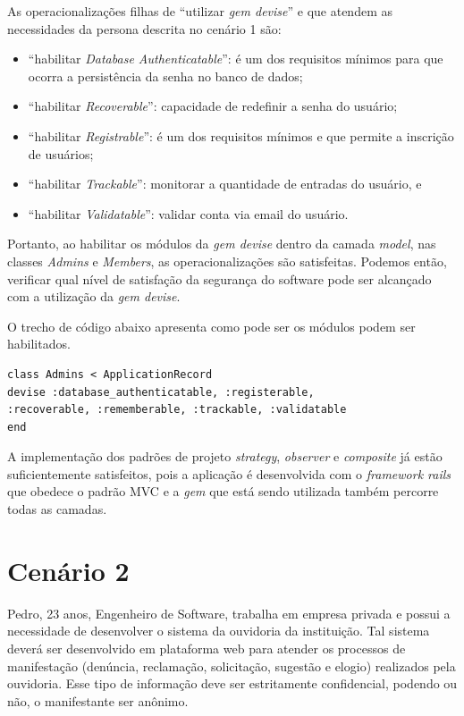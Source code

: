 As operacionalizações filhas de “utilizar \textit{gem devise}” e que atendem as necessidades da persona descrita no cenário 1 são:

\begin{itemize}
	\item “habilitar \textit{Database Authenticatable}”: é um dos requisitos mínimos para que ocorra a persistência da senha no banco de dados;
	\item “habilitar \textit{Recoverable}”: capacidade de redefinir a senha do usuário;
	\item “habilitar \textit{Registrable}”: é um dos requisitos mínimos e que permite a inscrição de usuários; 
	\item “habilitar \textit{Trackable}”: monitorar a quantidade de entradas do usuário, e 
	\item “habilitar \textit{Validatable}”: validar conta via email do usuário. 
\end{itemize}

Portanto, ao habilitar os módulos da \textit{gem devise} dentro da camada \textit{model}, nas classes \textit{Admins} e \textit{Members}, as operacionalizações são satisfeitas. Podemos então, verificar qual nível de satisfação da segurança do software pode ser alcançado com a utilização da \textit{gem devise}. 

O trecho de código abaixo apresenta como pode ser os módulos podem ser habilitados.  
 

\begin{lstlisting} 
class Admins < ApplicationRecord
devise :database_authenticatable, :registerable,
:recoverable, :rememberable, :trackable, :validatable
end 
\end{lstlisting} 

A implementação dos padrões de projeto \textit{strategy}, \textit{observer} e \textit{composite} já estão suficientemente satisfeitos, pois a aplicação é desenvolvida com o \textit{framework rails} que obedece o padrão MVC e a \textit{gem} que está sendo utilizada também percorre todas as camadas. 

\section{Cenário 2}
\label{subsec:persona2}

Pedro, 23 anos, Engenheiro de Software, trabalha em empresa privada e possui a necessidade de desenvolver o sistema da ouvidoria da instituição. Tal sistema deverá ser desenvolvido em plataforma web para atender os processos de manifestação (denúncia, reclamação, solicitação, sugestão e elogio) realizados pela ouvidoria. Esse tipo de informação deve ser estritamente confidencial, podendo ou não, o manifestante ser anônimo.  


